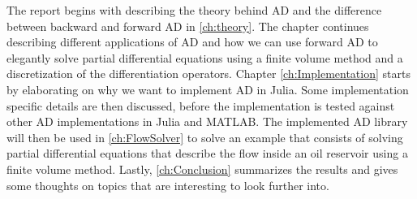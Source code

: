 The report begins with describing the theory behind AD and the difference between backward and forward AD in \autoref{ch:theory}. The chapter continues describing different applications of AD and how we can use forward AD to elegantly solve partial differential equations using a finite volume method and a discretization of the differentiation operators. Chapter \ref{ch:Implementation} starts by elaborating on why we want to implement AD in Julia. Some implementation specific details are then discussed, before the implementation is tested against other AD implementations in Julia and MATLAB. The implemented AD library will then be used in \autoref{ch:FlowSolver} to solve an example that consists of solving partial differential equations that describe the flow inside an oil reservoir using a finite volume method. Lastly, \autoref{ch:Conclusion} summarizes the results and gives some thoughts on topics that are interesting to look further into.